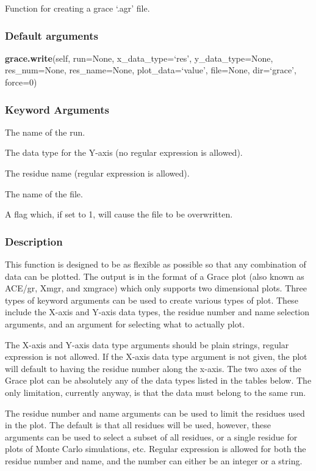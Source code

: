 Function for creating a grace `.agr' file.

\subsubsection{Default arguments}

\textsf{\textbf{grace.write}(self, run=None, x\_data\_type=`res', y\_data\_type=None, res\_num=None, res\_name=None, plot\_data=`value', file=None, dir=`grace', force=0)}


\subsubsection{Keyword Arguments}

  The name of the run.

  The data type for the Y-axis (no regular expression is allowed).

  The residue name (regular expression is allowed).

  The name of the file.

  A flag which, if set to 1, will cause the file to be overwritten.

\subsubsection{Description}

This function is designed to be as flexible as possible so that any combination of data can
be plotted.  The output is in the format of a Grace plot (also known as ACE/gr, Xmgr, and
xmgrace) which only supports two dimensional plots.  Three types of keyword arguments can
be used to create various types of plot.  These include the X-axis and Y-axis data types,
the residue number and name selection arguments, and an argument for selecting what to
actually plot.

The X-axis and Y-axis data type arguments should be plain strings, regular expression is not
allowed.  If the X-axis data type argument is not given, the plot will default to having the
residue number along the x-axis.  The two axes of the Grace plot can be absolutely any of
the data types listed in the tables below.  The only limitation, currently anyway, is that
the data must belong to the same run.

The residue number and name arguments can be used to limit the residues used in the plot.
The default is that all residues will be used, however, these arguments can be used to
select a subset of all residues, or a single residue for plots of Monte Carlo simulations,
etc.  Regular expression is allowed for both the residue number and name, and the number can
either be an integer or a string.

